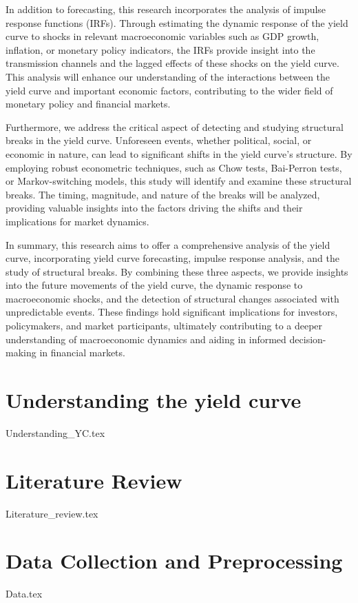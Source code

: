 \documentclass{vegaarticle}
\begin{document}
        In addition to forecasting, this research incorporates the analysis of impulse response functions (IRFs). Through estimating the dynamic response of the yield curve to shocks in relevant macroeconomic variables such as GDP growth, inflation, or monetary policy indicators, the IRFs provide insight into the transmission channels and the lagged effects of these shocks on the yield curve. This analysis will enhance our understanding of the interactions between the yield curve and important economic factors, contributing to the wider field of monetary policy and financial markets.
        
        Furthermore, we address the critical aspect of detecting and studying structural breaks in the yield curve. Unforeseen events, whether political, social, or economic in nature, can lead to significant shifts in the yield curve's structure. By employing robust econometric techniques, such as Chow tests, Bai-Perron tests, or Markov-switching models, this study will identify and examine these structural breaks. The timing, magnitude, and nature of the breaks will be analyzed, providing valuable insights into the factors driving the shifts and their implications for market dynamics.
        
        In summary, this research aims to offer a comprehensive analysis of the yield curve, incorporating yield curve forecasting, impulse response analysis, and the study of structural breaks. By combining these three aspects, we provide insights into the future movements of the yield curve, the dynamic response to macroeconomic shocks, and the detection of structural changes associated with unpredictable events. These findings hold significant implications for investors, policymakers, and market participants, ultimately contributing to a deeper understanding of macroeconomic dynamics and aiding in informed decision-making in financial markets.
            
    \section{Understanding the yield curve}
        {Understanding_YC.tex}

    \section{Literature Review}
        {Literature_review.tex}

    \section{Data Collection and Preprocessing}
        {Data.tex}
    
\end{document}
